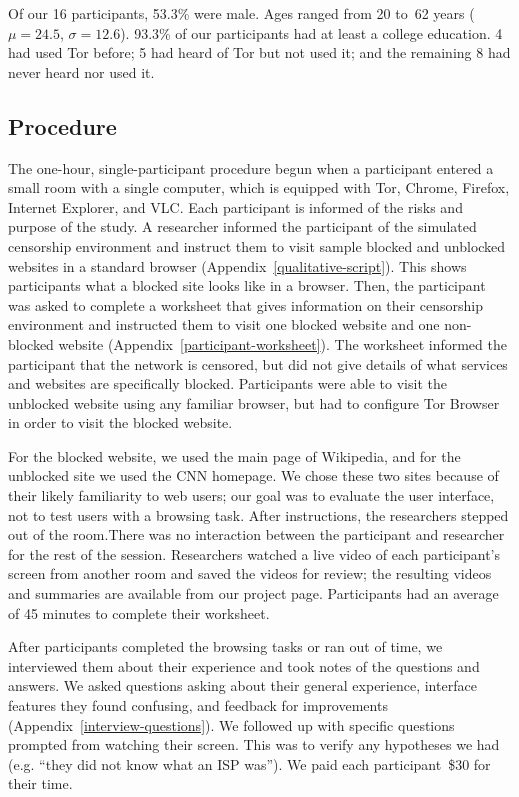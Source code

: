 \documentclass[USenglish,oneside,twocolumn]{article}
\begin{document}
Of our 16 participants, 53.3\% were male. 
Ages ranged from 20 to~62 years
($\mu = 24.5$, $\sigma = 12.6$). 
93.3\% of our participants had at least
a college education.
4 had used Tor before;
5 had heard of Tor but not used it;
and the remaining 8 had never heard nor used it.


\subsection{Procedure}
The one-hour, single-participant procedure begun when a participant entered a small 
room with a single computer, which is equipped with Tor, Chrome, Firefox, Internet Explorer, and VLC.
Each participant is informed of the risks and purpose of the study.
A researcher informed the participant of the simulated censorship environment and
instruct them to visit sample blocked and unblocked websites
in a standard browser (Appendix~\ref{qualitative-script}). 
This shows participants what a blocked site looks like in a browser. 
Then, the participant was asked to complete a worksheet that gives information
on their censorship environment and instructed them
to visit one blocked website and one non-blocked website (Appendix~\ref{participant-worksheet}).
The worksheet informed the participant that the network is censored,
but did not give details of what services and websites are specifically blocked.
Participants were able to visit the unblocked website using any familiar browser,
but had to configure Tor Browser in order to visit the blocked website.
 
For the blocked website, we used the main page of Wikipedia,
and for the unblocked site we used the CNN homepage.
We chose these two sites because of their likely familiarity to web users;
our goal was to evaluate the user interface, not to test users with a browsing task.
After instructions, the researchers stepped out of the room.There was no interaction
between the participant and researcher for the rest of the session.
Researchers watched a live video of each participant's screen from another room
and saved the videos for review; the resulting videos and summaries
are available from our project page.
Participants had an average of 45 minutes to complete their worksheet. 

After participants completed the browsing tasks or ran out of time,
we interviewed them about their experience and
took notes of the questions and answers.
We asked questions asking about their general experience, 
interface features they found confusing, and feedback for improvements (Appendix~\ref{interview-questions}). 
We followed up with specific questions prompted from watching their screen. 
This was to verify any hypotheses we had (e.g. ``they did not know what an ISP was'').
We paid each participant~\$30 for their time. 
\end{document}
